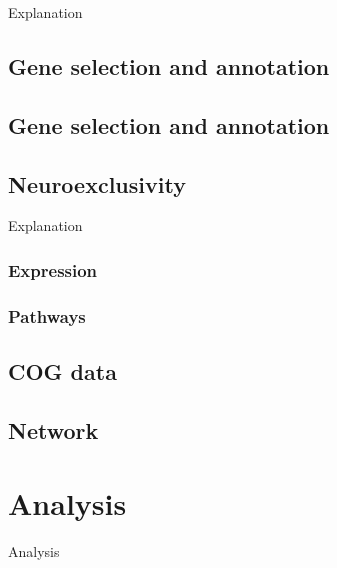 \documentclass[]{article}
\begin{document}
Explanation

\hypertarget{gene-selection-and-annotation}{%
\subsection{Gene selection and
annotation}\label{gene-selection-and-annotation}}

\hypertarget{gene-selection-and-annotation-1}{%
\subsection{Gene selection and
annotation}\label{gene-selection-and-annotation-1}}

\hypertarget{neuroexclusivity}{%
\subsection{Neuroexclusivity}\label{neuroexclusivity}}

Explanation

\hypertarget{expression}{%
\subsubsection{Expression}\label{expression}}

\hypertarget{pathways}{%
\subsubsection{Pathways}\label{pathways}}

\hypertarget{cog-data}{%
\subsection{COG data}\label{cog-data}}

\hypertarget{network}{%
\subsection{Network}\label{network}}

\hypertarget{analysis}{%
\section{Analysis}\label{analysis}}

Analysis


\end{document}
